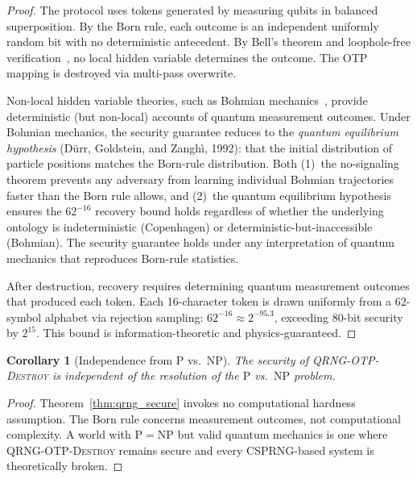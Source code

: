 \documentclass[acmsmall,screen,review,anonymous]{acmart}
\newtheorem{corollary}[theorem]{Corollary}
\begin{document}
\begin{proof}
The protocol uses tokens generated by measuring qubits in balanced superposition. By the Born rule, each outcome is an independent uniformly random bit with no deterministic antecedent. By Bell's theorem and loophole-free verification~\cite{hensen2015loophole}, no local hidden variable determines the outcome. The OTP mapping is destroyed via multi-pass overwrite.

Non-local hidden variable theories, such as Bohmian mechanics~\cite{bohm1952suggested}, provide deterministic (but non-local) accounts of quantum measurement outcomes. Under Bohmian mechanics, the security guarantee reduces to the \emph{quantum equilibrium hypothesis} (D\"urr, Goldstein, and Zangh\`{i}, 1992): that the initial distribution of particle positions matches the Born-rule distribution. Both (1)~the no-signaling theorem prevents any adversary from learning individual Bohmian trajectories faster than the Born rule allows, and (2)~the quantum equilibrium hypothesis ensures the $62^{-16}$ recovery bound holds regardless of whether the underlying ontology is indeterministic (Copenhagen) or deterministic-but-inaccessible (Bohmian). The security guarantee holds under any interpretation of quantum mechanics that reproduces Born-rule statistics.

After destruction, recovery requires determining quantum measurement outcomes that produced each token. Each 16-character token is drawn uniformly from a 62-symbol alphabet via rejection sampling: $62^{-16} \approx 2^{-95.3}$, exceeding 80-bit security by $2^{15}$. This bound is information-theoretic and physics-guaranteed.
\end{proof}

\begin{corollary}[Independence from P vs.\ NP]
\label{cor:pvsnp}
The security of \textsc{QRNG-OTP-Destroy} is independent of the resolution of the $\mathrm{P}$ vs.\ $\mathrm{NP}$ problem.
\end{corollary}

\begin{proof}
Theorem~\ref{thm:qrng_secure} invokes no computational hardness assumption. The Born rule concerns measurement outcomes, not computational complexity. A world with $\mathrm{P} = \mathrm{NP}$ but valid quantum mechanics is one where \textsc{QRNG-OTP-Destroy} remains secure and every CSPRNG-based system is theoretically broken.
\end{proof}

\end{document}
